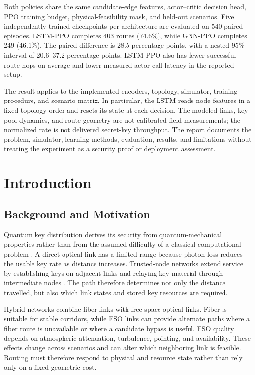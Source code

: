 \documentclass[12pt,a4paper,oneside]{report}
\begin{document}
Both policies share the same candidate-edge features, actor--critic decision head, PPO training budget, physical-feasibility mask, and held-out scenarios. Five independently trained checkpoints per architecture are evaluated on 540 paired episodes. LSTM-PPO completes 403 routes (74.6\%), while GNN-PPO completes 249 (46.1\%). The paired difference is 28.5 percentage points, with a nested 95\% interval of 20.6--37.2 percentage points. LSTM-PPO also has fewer successful-route hops on average and lower measured actor-call latency in the reported setup.

The result applies to the implemented encoders, topology, simulator, training procedure, and scenario matrix. In particular, the LSTM reads node features in a fixed topology order and resets its state at each decision. The modeled links, key-pool dynamics, and route geometry are not calibrated field measurements; the normalized rate is not delivered secret-key throughput. The report documents the problem, simulator, learning methods, evaluation, results, and limitations without treating the experiment as a security proof or deployment assessment.

\tableofcontents
\clearpage
{}
\listoffigures
\clearpage
{}
\listoftables
\clearpage
{}

\chapter{Introduction}

\section{Background and Motivation}
Quantum key distribution derives its security from quantum-mechanical properties rather than from the assumed difficulty of a classical computational problem \cite{bennett1984,scarani2009}. A direct optical link has a limited range because photon loss reduces the usable key rate as distance increases. Trusted-node networks extend service by establishing keys on adjacent links and relaying key material through intermediate nodes \cite{munro2015,ituY3800,ituY3803}. The path therefore determines not only the distance travelled, but also which link states and stored key resources are required.

Hybrid networks combine fiber links with free-space optical links. Fiber is suitable for stable corridors, while FSO links can provide alternate paths where a fiber route is unavailable or where a candidate bypass is useful. FSO quality depends on atmospheric attenuation, turbulence, pointing, and availability. These effects change across scenarios and can alter which neighboring link is feasible. Routing must therefore respond to physical and resource state rather than rely only on a fixed geometric cost.
\end{document}
